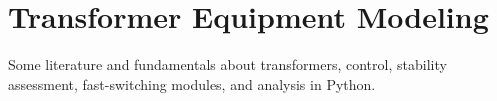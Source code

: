 




\chapter{Transformer Equipment Modeling}


Some literature and fundamentals about transformers, control, stability assessment, fast-switching modules, and analysis in Python. %



